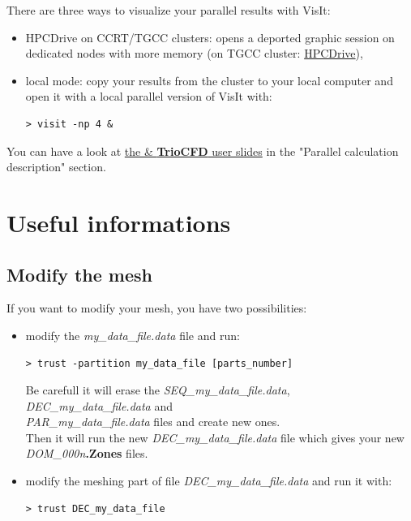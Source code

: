 There are three ways to visualize your parallel results with VisIt:
\begin{itemize}
\item HPCDrive on CCRT/TGCC clusters: opens a deported graphic session on dedicated nodes with more memory (on TGCC cluster: \href{https://visu-tgcc.ccc.cea.fr/HPCDrive/home}{HPCDrive}),
\item local mode: copy your results from the cluster to your local computer and open it with a local parallel version of VisIt with:
\begin{verbatim}
> visit -np 4 &
\end{verbatim}
\end{itemize}

You can have a look at \href{TRUST_and_TrioCFD_presentation.pdf}{the \trust \& \textbf{TrioCFD} user slides} in the "Parallel calculation description" section.




\section{Useful informations}
\subsection{Modify the mesh}
If you want to modify your mesh, you have two possibilities:
\begin{itemize} 
\item modify the \textit{my\_data\_file.data} file and run:
\begin{verbatim}
> trust -partition my_data_file [parts_number]
\end{verbatim}
Be carefull it will erase the \textit{SEQ\_my\_data\_file.data}, \textit{DEC\_my\_data\_file.data} and \\
\textit{PAR\_my\_data\_file.data} files and create new ones.\\
Then it will run the new \textit{DEC\_my\_data\_file.data} file which gives your new \textit{DOM\_000n}\textbf{.Zones} files.

\item modify the meshing part of file \textit{DEC\_my\_data\_file.data} and run it with:
\begin{verbatim}
> trust DEC_my_data_file
\end{verbatim}
\end{itemize}

